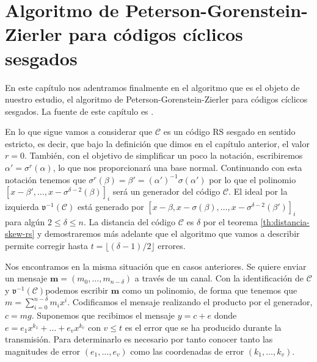 \chapter{Algoritmo de Peterson-Gorenstein-Zierler para códigos cíclicos sesgados}

En este capítulo nos adentramos finalmente en el algoritmo que es el objeto de nuestro estudio, el algoritmo de Peterson-Gorenstein-Zierler para códigos cíclicos sesgados.
La fuente de este capítulo es \parencite{gomez-torrecillas_petersongorensteinzierler_2018}.

En lo que sigue vamos a considerar que \(\mathcal C\) es un código RS sesgado en sentido estricto, es decir, que bajo la definición que dimos en el capítulo anterior, el valor \(r = 0\).
También, con el objetivo de simplificar un poco la notación, escribiremos \(\alpha' = \sigma^r(\alpha)\), lo que nos proporcionará una base normal.
Continuando con esta notación tenemos que \(\sigma^r(\beta) = \beta' = (\alpha')^{-1}\sigma(\alpha')\) por lo que el polinomio \([x - \beta', \dots, x - \sigma^{\delta - 2}(\beta)]_i\) será un generador del código \(\mathcal C\).
El ideal por la izquierda \(\mathfrak v^{-1}(\mathcal C)\) está generado por \([x - \beta, x - \sigma(\beta), \dots, x - \sigma^{\delta - 2}(\beta')]_i\) para algún \(2 \leq \delta \leq n\).
La distancia del código \(\mathcal C\) es \(\delta\) por el teorema \ref{th:distancia-skew-rs} y demostraremos más adelante que el algoritmo que vamos a describir permite corregir hasta \(t = \lfloor (\delta - 1)/2 \rfloor\) errores.

Nos encontramos en la misma situación que en casos anteriores.
Se quiere enviar un mensaje \(\mathbf{m} = (m_0, \dots, m_{n - \delta})\) a través de un canal.
Con la identificación de \(\mathcal C\) y \(\mathfrak v^{-1}(\mathcal C)\)podemos escribir \(\mathbf{m}\) como un polinomio, de forma que tenemos que \(m = \sum_{i=0}^{n-\delta}m_ix^{i}\).
Codificamos el mensaje realizando el producto por el generador, \(c = mg\).
Suponemos que recibimos el mensaje \(y = c + e\) donde \(e = e_1x^{k_1} + \dots + e_vx^{k_v}\) con \(v \leq t\) es el error que se ha producido durante la transmisión.
Para determinarlo es necesario por tanto conocer tanto las magnitudes de error \((e_{1}, \dots, e_{v})\) como las coordenadas de error \((k_1, \dots, k_v)\).

